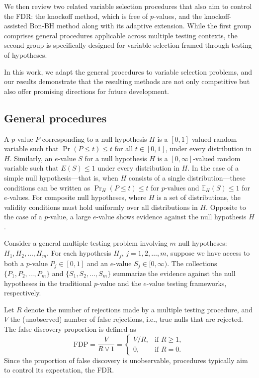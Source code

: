 \documentclass[11pt]{article}
\numberwithin{equation}{section}
\theoremstyle{plain}
\theoremstyle{remark}
\begin{document}
We then review two related variable selection procedures that also aim to control the FDR: the knockoff method, which is free of \(p\)-values, and the knockoff-assisted Bon-BH method along with its adaptive extension. While the first group comprises general procedures applicable across multiple testing contexts, the second group is specifically designed for variable selection framed through testing of hypotheses.

In this work, we adapt the general procedures to variable selection problems, and our results demonstrate that the resulting methods are not only competitive but also offer promising directions for future development.

\subsection{General procedures}

A $p$-value $P$ corresponding to a null hypothesis $H$ is a $[0,1]$-valued random variable such that $\Pr(P \leq t) \leq t$ for all $t \in [0,1]$, under every distribution in $H$. Similarly, an $e$-value $S$ for a null hypothesis $H$ is a $[0, \infty]$-valued random variable such that $E(S) \leq 1$ under every distribution in $H$. In the case of a simple null hypothesis—that is, when $H$ consists of a single distribution—these conditions can be written as $\Pr_H(P \leq t) \leq t$ for $p$-values and $\mathbb{E}_H(S) \leq 1$ for $e$-values. For composite null hypotheses, where $H$ is a set of distributions, the validity conditions must hold uniformly over all distributions in $H$. Opposite to the case of a $p$-value, a large $e$-value shows evidence against the null hypothesis $H$. 

Consider a general multiple testing problem involving \( m \) null hypotheses:
\(
H_1, H_2, \ldots, H_m.
\)
For each hypothesis \( H_j \), \( j = 1, 2, \ldots, m \), suppose we have access to both a \( p \)-value \( P_j \in [0,1] \) and an \( e \)-value \( S_j \in [0,\infty) \). The collections \( \{P_1, P_2, \ldots, P_m\} \) and \( \{S_1, S_2, \ldots, S_m\} \) summarize the evidence against the null hypotheses in the traditional \( p \)-value and the \( e \)-value testing frameworks, respectively.  

Let \( R \) denote the number of rejections made by a multiple testing procedure, and \( V \) the (unobserved) number of false rejections, i.e., true nulls that are rejected. The false discovery proportion is defined as
\[
\mathrm{FDP} = \frac{V}{R \vee 1} = 
\begin{cases}
V/R, & \text{if } R \geq 1, \\
0, & \text{if } R = 0.
\end{cases}
\] 
Since the proportion of false discovery is unobservable, procedures typically aim to control its expectation, the FDR.
\end{document}
